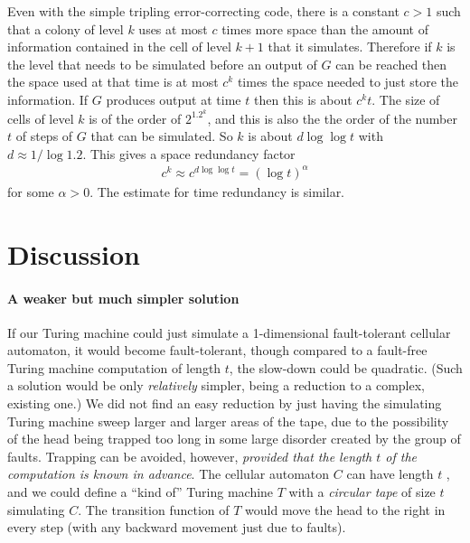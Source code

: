 \documentclass[11pt]{memoir}
\theoremstyle{definition} %
\begin{document}
 Even with the simple tripling error-correcting code, there is a constant \( c>1 \) such that
 a colony of level \( k \) uses at most
 \( c \) times more space than the amount of information contained in the
 cell of level \( k+1 \) that it simulates.
 Therefore if \( k \) is the level that needs to be simulated before an output of \( G \) can be reached
 then the space used at that time is at most \( c^{k} \) times the space needed to just store the information.
 If \( G \) produces output at time \( t \) then this is about \( c^{k}t \).
 The size of cells of level \( k \) is of the order of \( 2^{1.2^{k}} \), and this is also the
 the order of the number \( t \) of steps of \( G \) that can be simulated.
 So \( k \) is about \( d\log\log t \) with \( d\approx 1/\log 1.2 \).
 This gives a space redundancy factor
 \begin{align*}
 c^{k}\approx c^{d\log\log t}=(\log t)^{\alpha}  
\end{align*}
 for some \( \alpha>0 \).
 The estimate for time redundancy is similar.

 \section{Discussion}

\paragraph{A weaker but much simpler solution}
If our Turing machine could just simulate a 1-dimensional
fault-tolerant cellular automaton, it would become
fault-tolerant, though compared to a fault-free Turing machine computation of length \( t \),
the slow-down could be quadratic.
(Such a solution would be only \emph{relatively} simpler, being a reduction to a complex, existing one.)
We did not find an easy reduction by just having the simulating
Turing machine sweep larger and larger
areas of the tape, due to the possibility of the head being trapped too long in some large disorder created by
the group of faults.
Trapping can be avoided, however, 
\emph{provided that the length \( t \) of the computation is known in advance}.
The cellular automaton \( C \) can have length \( t \) , and we could define
a ``kind of'' Turing machine \( T \) with a \emph{circular tape} of size \( t \) simulating \( C \).
The transition function of \( T \) would move the head to the right in every step
(with any backward movement just due to faults).
\end{document}
